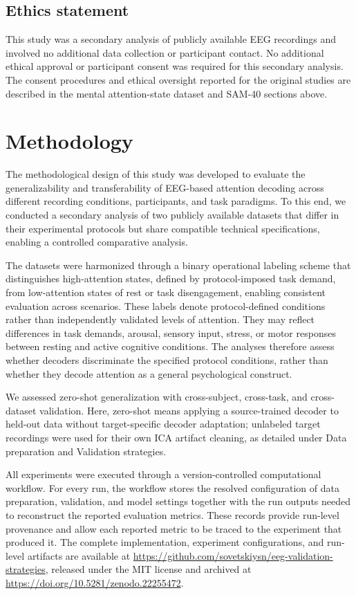 \documentclass[10pt,letterpaper]{article}
\newcommand{\rev}[1]{#1}
\begin{document}
\subsection*{Ethics statement}

This study was a secondary analysis of publicly available EEG recordings and involved no additional data collection or participant contact. No additional ethical approval or participant consent was required for this secondary analysis. The consent procedures and ethical oversight reported for the original studies are described in the mental attention-state dataset and SAM-40 sections above.

\section*{Methodology}

The methodological design of this study was developed to evaluate the generalizability and transferability of EEG-based attention decoding across different recording conditions, participants, and task paradigms. To this end, we conducted a secondary analysis of two publicly available datasets that differ in their experimental protocols but share compatible technical specifications, enabling a controlled comparative analysis.

\rev{The datasets were harmonized through a binary operational labeling scheme that
distinguishes high-attention states, defined by protocol-imposed task demand,
from low-attention states of rest or task disengagement, enabling consistent
evaluation across scenarios. These labels denote protocol-defined conditions
rather than independently validated levels of attention. They may reflect
differences in task demands, arousal, sensory input, stress, or motor responses
between resting and active cognitive conditions. The analyses therefore assess
whether decoders discriminate the specified protocol conditions, rather than
whether they decode attention as a general psychological construct.}

\rev{We assessed zero-shot generalization with cross-subject, cross-task, and
cross-dataset validation. Here, zero-shot means applying a source-trained
decoder to held-out data without target-specific decoder adaptation; unlabeled
target recordings were used for their own ICA artifact cleaning, as detailed
under Data preparation and Validation strategies.}

All experiments were executed through a version-controlled computational workflow. For every run, the workflow stores the resolved configuration of data preparation, validation, and model settings together with the run outputs needed to reconstruct the reported evaluation metrics. These records provide run-level provenance and allow each reported metric to be traced to the experiment that produced it. The complete implementation, experiment configurations, and run-level artifacts are available at \url{https://github.com/sovetskiysn/eeg-validation-strategies}, released under the MIT license and archived at \url{https://doi.org/10.5281/zenodo.22255472}.
\end{document}

